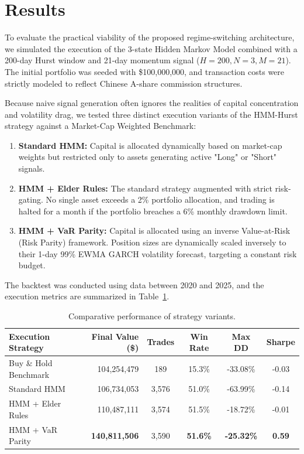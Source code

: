 \documentclass[12pt]{article}
\begin{document}
\section{Results}
To evaluate the practical viability of the proposed regime-switching architecture, we simulated the execution of the 3-state Hidden Markov Model combined with a 200-day Hurst window and 21-day momentum signal ($H=200, N=3, M=21$). The initial portfolio was seeded with \$100,000,000, and transaction costs were strictly modeled to reflect Chinese A-share commission structures. 

Because naive signal generation often ignores the realities of capital concentration and volatility drag, we tested three distinct execution variants of the HMM-Hurst strategy against a Market-Cap Weighted Benchmark:
\begin{enumerate}
    \item \textbf{Standard HMM:} Capital is allocated dynamically based on market-cap weights but restricted only to assets generating active "Long" or "Short" signals.
    \item \textbf{HMM + Elder Rules:} The standard strategy augmented with strict risk-gating. No single asset exceeds a 2\% portfolio allocation, and trading is halted for a month if the portfolio breaches a 6\% monthly drawdown limit.
    \item \textbf{HMM + VaR Parity:} Capital is allocated using an inverse Value-at-Risk (Risk Parity) framework. Position sizes are dynamically scaled inversely to their 1-day 99\% EWMA GARCH volatility forecast, targeting a constant risk budget.
\end{enumerate}

The backtest was conducted using data between 2020 and 2025, and the execution metrics are summarized in Table~\ref{tab:execution_results}.

\begin{table}[h!]
\centering
\small
\begin{tabularx}{\textwidth}{|X|r|c|c|c|c|}
\hline
\textbf{Execution Strategy} & \textbf{Final Value (\$)} & \textbf{Trades} & \textbf{Win Rate} & \textbf{Max DD} & \textbf{Sharpe} \\
\hline
Buy \& Hold Benchmark & 104,254,479 & 189 & 15.3\% & -33.08\% & -0.03 \\
\hline
Standard HMM & 106,734,053 & 3,576 & 51.0\% & -63.99\% & -0.14 \\
\hline
HMM + Elder Rules & 110,487,111 & 3,574 & 51.5\% & -18.72\% & -0.01 \\
\hline
HMM + VaR Parity & \textbf{140,811,506} & 3,590 & \textbf{51.6\%} & \textbf{-25.32\%} & \textbf{0.59} \\
\hline
\end{tabularx}
\caption{Comparative performance of strategy variants.}
\label{tab:execution_results}
\end{table}
\end{document}
